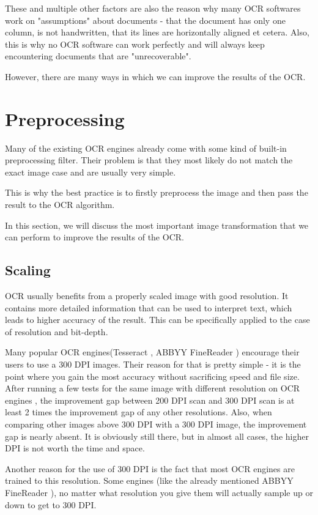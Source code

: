 These and multiple other factors are also the reason why many OCR softwares work on "assumptions" about documents - that the document has only one column, is not handwritten, that its lines are horizontally aligned et cetera. Also, this is why no OCR software can work perfectly and will always keep encountering documents that are "unrecoverable". 

However, there are many ways in which we can improve the results of the OCR.

\section{Preprocessing}

Many of the existing OCR engines already come with some kind of built-in preprocessing filter. Their problem is that they most likely do not match the exact image case and are usually very simple.

This is why the best practice is to firstly preprocess the image and then pass the result to the OCR algorithm.

In this section, we will discuss the most important image transformation that we can perform to improve the results of the OCR. 

\subsection{Scaling}

OCR usually benefits from a properly scaled image with good resolution. It contains more detailed information that can be used to interpret text, which leads to higher accuracy of the result. This can be specifically applied to the case of resolution and bit-depth.

Many popular OCR engines(Tesseract \citep{TesseractQual}, ABBYY FineReader \citep{ABBYYdpi}) encourage their users to use a 300 DPI images. Their reason for that is pretty simple - it is the point where you gain the most accuracy without sacrificing speed and file size. After running a few tests for the same image with different resolution on OCR engines \citep{preprocessAll}, the improvement gap between 200 DPI scan and 300 DPI scan is at least 2 times the improvement gap of any other resolutions. Also, when comparing other images above 300 DPI with a 300 DPI image, the improvement gap is nearly absent. It is obviously still there, but in almost all cases, the higher DPI is not worth the time and space. 

Another reason for the use of 300 DPI is the fact that most OCR engines are trained to this resolution. Some engines (like the already mentioned ABBYY FineReader \citep{ABBYYdpi}), no matter what resolution you give them will actually sample up or down to get to 300 DPI. 

